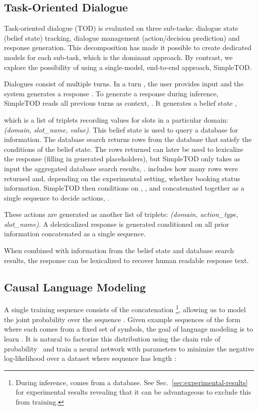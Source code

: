 \documentclass{article}
\begin{document}
\subsection{Task-Oriented Dialogue} 
\label{ssec:model-task}
Task-oriented dialogue (TOD) is evaluated on three sub-tasks: 
dialogue state (belief state) tracking, 
dialogue management (action/decision prediction)
and response generation. 
This decomposition has made it possible to create dedicated models for each sub-task, 
which is the dominant approach.
By contrast, 
we explore the possibility of using a single-model, 
end-to-end approach, 
SimpleTOD.

Dialogues consist of multiple turns.
In a turn , the user provides input  and the system generates a response .
To generate a response during inference, 
SimpleTOD reads all previous turns as context, .
It generates a belief state ,

which is a list of triplets recording values for slots in a particular domain: \textit{(domain, slot\_name, value)}. 
This belief state is used to query a database for information. The database search returns rows from the database that satisfy the conditions of the belief state. 
The rows returned can later be used to lexicalize the response (filling in generated placeholders),
but SimpleTOD only takes as input the aggregated database search results, . 
 includes how many rows were returned and, depending on the experimental setting, whether booking status information.
SimpleTOD then conditions on , , and  concatenated together as a single sequence to decide actions, . 

These actions are generated as another list of triplets: \textit{(domain, action\_type, slot\_name)}.
A delexicalized response  is generated conditioned on all prior information concatenated as a single sequence. 






When combined with information from the belief state and database search results, the response can be lexicalized to recover human readable response text. 









\subsection{Causal Language Modeling} 
\label{ssec:lm}
A single training sequence consists of the concatenation 
\footnote{During inference,  comes from a database. See Sec.~\ref{sec:experimental-results} for experimental results revealing that it can be advantageous to exclude this from training.}, 
allowing us to model the joint probability over the sequence . 
Given example sequences of the form  where each  comes from a fixed set of symbols, the goal of language modeling is to learn . 
It is natural to factorize this distribution using the chain rule of probability~\citep{bengio2003neural}
and train a neural network with parameters  to minimize the negative log-likelihood over a dataset  where sequence  has length : 
\end{document}
